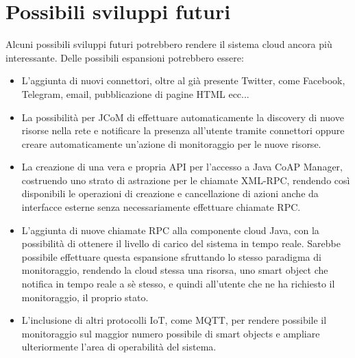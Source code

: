 \section{Possibili sviluppi futuri}
Alcuni possibili sviluppi futuri potrebbero rendere il sistema cloud ancora più interessante. Delle possibili espansioni potrebbero essere:
\begin{itemize}
\item L'aggiunta di nuovi connettori, oltre al già presente Twitter, come Facebook, Telegram, email, pubblicazione di pagine HTML ecc...
\item La possibilità per JCoM di effettuare automaticamente la discovery di nuove risorse nella rete e notificare la presenza all'utente tramite connettori oppure creare automaticamente un'azione di monitoraggio per le nuove risorse.
\item La creazione di una vera e propria API per l'accesso a Java CoAP Manager, costruendo uno strato di astrazione per le chiamate XML-RPC, rendendo così disponibili le operazioni di creazione e cancellazione di azioni anche da interfacce esterne senza necessariamente effettuare chiamate RPC.
\item L'aggiunta di nuove chiamate RPC alla componente cloud Java, con la possibilità di ottenere il livello di carico del sistema in tempo reale. Sarebbe possibile effettuare questa espansione sfruttando lo stesso paradigma di monitoraggio, rendendo la cloud stessa una risorsa, uno smart object che notifica in tempo reale a sè stesso, e quindi all'utente che ne ha richiesto il monitoraggio, il proprio stato.
\item L'inclusione di altri protocolli IoT, come MQTT, per rendere possibile il monitoraggio sul maggior numero possibile di smart objects e ampliare ulteriormente l'area di operabilità del sistema.
\end{itemize}

